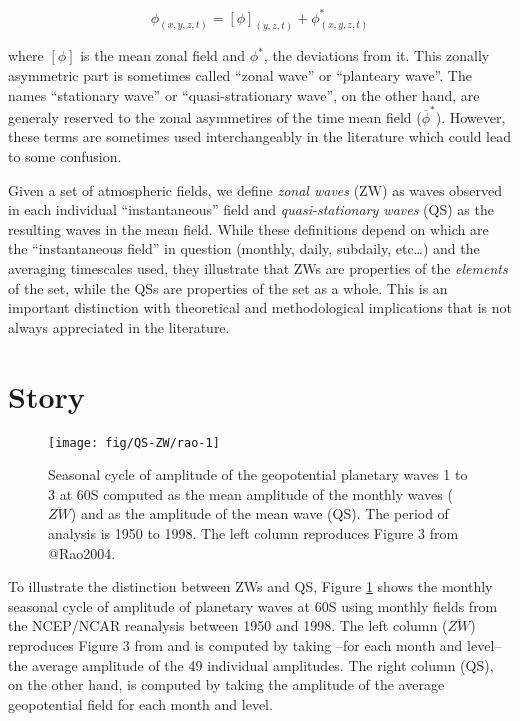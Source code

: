 \documentclass[draft,linenumbers]{agujournal2018}
\begin{document}
\begin{linenomath*}
\begin{equation}\label{eq:Z}
\phi_{(x, y, z, t)} = [\phi]_{(y, z, t)} + \phi_{(x, y, z, t)}^*
\end{equation}
\end{linenomath*}

where \([\phi]\) is the mean zonal field and \(\phi^*\), the deviations
from it. This zonally asymmetric part is sometimes called ``zonal wave''
or ``planteary wave''. The names ``stationary wave'' or
``quasi-strationary wave'', on the other hand, are generaly reserved to
the zonal asymmetires of the time mean field (\(\overline{\phi}^*\)).
However, these terms are sometimes used interchangeably in the
literature
\citep[e.g.][]{Rao2004, Raphael2004, Kravchenko2012, Irving2015, Turner2017, Lastovicka2018}
which could lead to some confusion.

Given a set of atmospheric fields, we define \emph{zonal waves} (ZW) as
waves observed in each individual ``instantaneous'' field and
\emph{quasi-stationary waves} (QS) as the resulting waves in the mean
field. While these definitions depend on which are the ``instantaneous
field'' in question (monthly, daily, subdaily, etc\ldots{}) and the
averaging timescales used, they illustrate that ZWs are properties of
the \emph{elements} of the set, while the QSs are properties of the set
as a whole. This is an important distinction with theoretical and
methodological implications that is not always appreciated in the
literature.

\section{Story}

\begin{figure}[h]

{\centering \texttt{[image: fig/QS-ZW/rao-1]} 

}

\caption{Seasonal cycle of amplitude of the geopotential planetary waves 1 to 3 at 60\degree S computed as the mean amplitude of the monthly waves ($\overline{ZW}$) and as the amplitude of the mean wave (QS). The period of analysis is 1950 to 1998. The left column reproduces Figure 3 from @Rao2004.}\label{fig:rao}
\end{figure}

To illustrate the distinction between ZWs and QS, Figure \ref{fig:rao}
shows the monthly seasonal cycle of amplitude of planetary waves at
60\degree S using monthly fields from the NCEP/NCAR reanalysis
\citep{Kalnay1996} between 1950 and 1998. The left column
(\(\overline{ZW}\)) reproduces Figure 3 from \citet{Rao2004} and is
computed by taking --for each month and level-- the average amplitude of
the 49 individual amplitudes. The right column (QS), on the other hand,
is computed by taking the amplitude of the average geopotential field
for each month and level.
\end{document}
